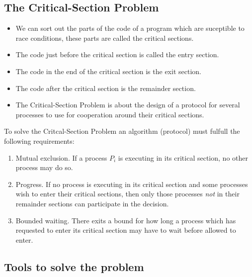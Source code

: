 \documentclass{beamer}
\begin{document}
\subsection{The Critical-Section Problem}

\begin{frame}{\insertsubsectionhead}
  \begin{itemize}
    \item We can sort out the parts of the code of a program which are 
      suceptible to race conditions, these parts are called the critical 
      sections.

    \item The code just before the critical section is called the entry 
      section.

    \item The code in the end of the critical section is the exit section.

    \item The code after the critical section is the remainder section.

    \item The Critical-Section Problem is about the design of a protocol for 
      several processes to use for cooperation around their critical sections.

  \end{itemize}
\end{frame}

\begin{frame}{\insertsubsectionhead}
  To solve the Critcal-Section Problem an algorithm (protocol) must fulfull the 
  following requirements:
  \begin{enumerate}
    \item Mutual exclusion.
      If a process \(P_i\) is executing in its critical section, no other 
      process may do so.
    \item Progress.
      If no process is executing in its critical section and some processes 
      wish to enter their critical sections, then only those processes 
      \emph{not} in their remainder sections can participate in the decision.
    \item Bounded waiting.
      There exits a bound for how long a process which has requested to enter 
      its critical section may have to wait before allowed to enter.
  \end{enumerate}
\end{frame}

\subsection{Tools to solve the problem}
\end{document}

